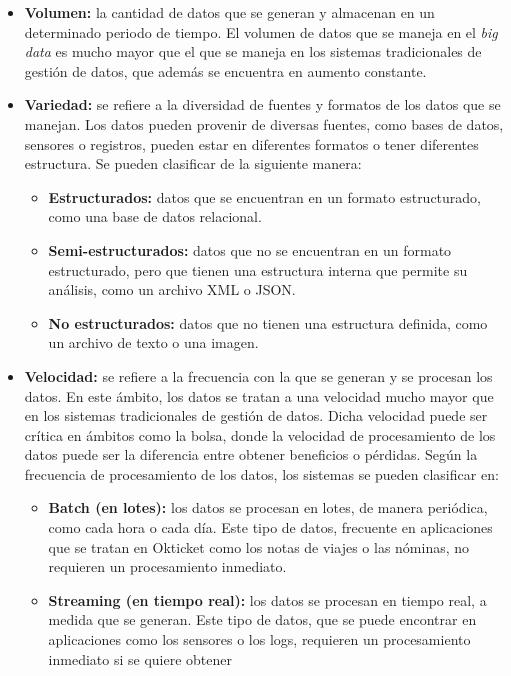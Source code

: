 \begin{itemize}
	\item \textbf{Volumen:} la cantidad de datos que se generan y almacenan en
		un determinado periodo de tiempo. El volumen de datos que se maneja en
		el \textit{big data} es mucho mayor que el que se maneja en los sistemas
		tradicionales de gestión de datos, que además se encuentra en aumento
		constante.
	\item \textbf{Variedad:} se refiere a la diversidad de fuentes y formatos de
		los datos que se manejan. Los datos pueden provenir de diversas fuentes,
		como bases de datos, sensores o registros, pueden estar en
		diferentes formatos o tener diferentes estructura. Se pueden clasificar
		de la siguiente manera: \begin{itemize}
			\item \textbf{Estructurados:} datos que se encuentran en un formato
				estructurado, como una base de datos relacional.
			\item \textbf{Semi-estructurados:} datos que no se encuentran en un
				formato estructurado, pero que tienen una estructura interna
				que permite su análisis, como un archivo XML o JSON.
			\item \textbf{No estructurados:} datos que no tienen una estructura
				definida, como un archivo de texto o una imagen.
		\end{itemize}
	\item \textbf{Velocidad:} se refiere a la frecuencia con la que se generan y
		se procesan los datos. En este ámbito, los datos se tratan a una
		velocidad mucho mayor que en los sistemas tradicionales de gestión de
		datos. Dicha velocidad puede ser crítica en ámbitos como la bolsa,
		donde la velocidad de procesamiento de los datos puede ser la
		diferencia entre obtener beneficios o pérdidas. Según la frecuencia de
		procesamiento de los datos, los sistemas se pueden clasificar en:
		\begin{itemize}
			\item \textbf{Batch (en lotes):} los datos se procesan en lotes, de
				manera periódica, como cada hora o cada día. Este tipo de datos,
				frecuente en aplicaciones que se tratan en Okticket como los
				notas de viajes o las nóminas, no requieren un procesamiento
				inmediato.
			\item \textbf{Streaming (en tiempo real):} los datos se procesan en
				tiempo real, a medida que se generan. Este tipo de datos, que se
				puede encontrar en aplicaciones como los sensores o los logs,
				requieren un procesamiento inmediato si se quiere obtener

\end{itemize}
\end{itemize}
